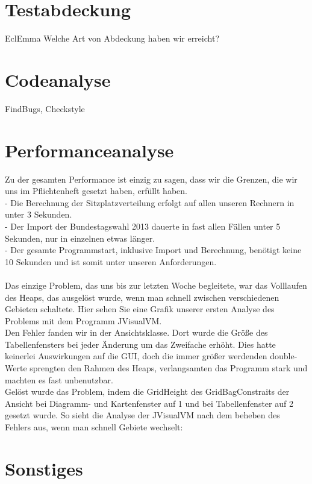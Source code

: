 \documentclass[12pt,a4paper,titlepage]{article}
\begin{document}
\section{Testabdeckung}
EclEmma
Welche Art von Abdeckung haben wir erreicht?

\section{Codeanalyse}
FindBugs, Checkstyle

\section{Performanceanalyse}

Zu der gesamten Performance ist einzig zu sagen, dass wir die Grenzen, die wir uns im Pflichtenheft gesetzt haben, erfüllt haben.\\
- Die Berechnung der Sitzplatzverteilung erfolgt auf allen unseren Rechnern in unter 3 Sekunden.\\
- Der Import der Bundestagswahl 2013 dauerte in fast allen Fällen unter 5 Sekunden, nur in einzelnen etwas länger.\\
- Der gesamte Programmstart, inklusive Import und Berechnung, benötigt keine 10 Sekunden und ist somit unter unseren Anforderungen. \\
\\
Das einzige Problem, das uns bis zur letzten Woche begleitete, war das Volllaufen des Heaps, das ausgelöst wurde, wenn man schnell zwischen verschiedenen Gebieten schaltete. Hier sehen Sie eine Grafik unserer ersten Analyse des Problems mit dem Programm JVisualVM.\\



Den Fehler fanden wir in der Ansichtsklasse. Dort wurde die Größe des Tabellenfensters bei jeder Änderung um das Zweifache erhöht. Dies hatte keinerlei Auswirkungen auf die GUI, doch die immer größer werdenden double-Werte sprengten den Rahmen des Heaps, verlangsamten das Programm stark und machten es fast unbenutzbar.\\
Gelöst wurde das Problem, indem die GridHeight des GridBagConstraits der Ansicht bei Diagramm- und Kartenfenster auf 1 und bei Tabellenfenster auf 2 gesetzt wurde. So sieht die Analyse der JVisualVM nach dem beheben des Fehlers aus, wenn man schnell Gebiete wechselt:\\


\section{Sonstiges}
\end{document}
